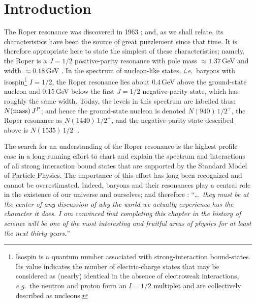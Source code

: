 \section{Introduction}
%
The Roper resonance was discovered in 1963 \cite{Roper:1964zza, BAREYRE1964137, AUVIL196476, PhysRevLett.13.555, PhysRev.138.B190}; and, as we shall relate, its characteristics have been the source of great puzzlement since that time.  It is therefore appropriate here to state the simplest of these characteristics; namely, the Roper is a $J=1/2$ positive-parity resonance with pole mass $\approx 1.37\,$GeV and width $\approx 0.18\,$GeV \cite{Olive:2016xmw}.  In the spectrum of nucleon-like states, \emph{i.e}.\ baryons with isospin\footnote{Isospin is a quantum number associated with strong-interaction bound-states.  Its value indicates the number of electric-charge states that may be considered as (nearly) identical in the absence of electroweak interactions, \emph{e.g}.\ the neutron and proton form an $I=1/2$ multiplet and are collectively described as nucleons.}  %
%
$I=1/2$, the Roper resonance lies about $0.4\,$GeV above the ground-state nucleon and $0.15\,$GeV below the first $J=1/2$ negative-parity state, which has roughly the same width.  Today, the levels in this spectrum are labelled thus:
%
$N({\rm mass})\,J^P$;
%
and hence the ground-state nucleon is denoted $N(940)\,1/2^+$, the Roper resonance as $N(1440)\,1/2^+$, and the negative-parity state described above is $N(1535)\,1/2^-$.

The search for an understanding of the Roper resonance is the highest profile case in a long-running effort to chart and explain the spectrum and interactions of all strong interaction bound states that are supported by the Standard Model of Particle Physics.  The importance of this effort has long been recognized and cannot be overestimated.  Indeed, baryons and their resonances play a central role in the existence of our universe and ourselves; and therefore \cite{Isgur:2000ad}: ``\emph{\ldots\ they must be at the center of any discussion of why the world we actually experience has the character it does.  I am convinced that completing this chapter in the history of science will be one of the most interesting and fruitful areas of physics for at least the next thirty years.}''

